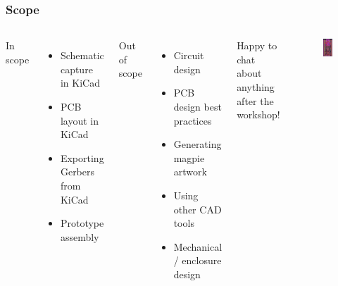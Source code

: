 \documentclass[aspectratio=169, t]{beamer}
\begin{document}
\begin{frame}
	\frametitle{Scope}	
	\begin{columns}
		In scope
		\begin{itemize}
			\item Schematic capture in KiCad
			\item PCB layout in KiCad
			\item Exporting Gerbers from KiCad
			\item Prototype assembly
		\end{itemize}

		Out of scope
		\begin{itemize}
			\item Circuit design
			\item PCB design best practices
			\item Generating magpie artwork
			\item Using other CAD tools
			\item Mechanical / enclosure design
		\end{itemize}
		
		Happy to chat about anything after the workshop!
		\vspace{-8mm}
		\begin{figure}
			\includegraphics[width=0.6\linewidth]{images/ecp5_mini.png}
		\end{figure}

	\end{columns}


\end{frame}
\end{document}
